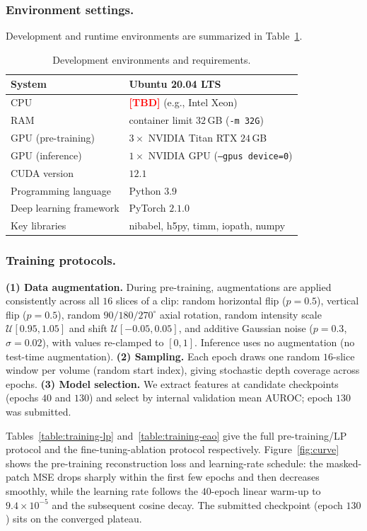 \documentclass[runningheads]{llncs}
\newcommand{\tba}{\textcolor{red}{\textbf{[TBD]}}}
\begin{document}
\subsubsection{Environment settings.}
Development and runtime environments are summarized in Table~\ref{table:env}.

\begin{table}[!htbp]
\caption{Development environments and requirements.}\label{table:env}
\centering
\begin{tabular}{ll}
\hline
System            & Ubuntu 20.04 LTS \\ \hline
CPU               & \tba{} (e.g., Intel Xeon) \\ \hline
RAM               & container limit $32$\,GB (\texttt{-m 32G}) \\ \hline
GPU (pre-training)& $3\times$ NVIDIA Titan RTX $24$\,GB \\ \hline
GPU (inference)   & $1\times$ NVIDIA GPU (\texttt{--gpus device=0}) \\ \hline
CUDA version      & $12.1$ \\ \hline
Programming language & Python $3.9$ \\ \hline
Deep learning framework & PyTorch $2.1.0$ \\ \hline
Key libraries     & nibabel, h5py, timm, iopath, numpy \\ \hline
\end{tabular}
\end{table}

\subsubsection{Training protocols.}
\textbf{(1) Data augmentation.} During pre-training, augmentations are applied
consistently across all $16$ slices of a clip: random horizontal flip ($p{=}0.5$),
vertical flip ($p{=}0.5$), random $90/180/270^{\circ}$ axial rotation, random
intensity scale $\mathcal{U}[0.95,1.05]$ and shift $\mathcal{U}[-0.05,0.05]$, and
additive Gaussian noise ($p{=}0.3$, $\sigma{=}0.02$), with values re-clamped to
$[0,1]$. Inference uses no augmentation (no test-time augmentation).
\textbf{(2) Sampling.} Each epoch draws one random $16$-slice window per volume
(random start index), giving stochastic depth coverage across epochs.
\textbf{(3) Model selection.} We extract features at candidate checkpoints
(epochs $40$ and $130$) and select by internal validation mean AUROC; epoch
$130$ was submitted.

Tables~\ref{table:training-lp} and~\ref{table:training-eao} give the full
pre-training/LP protocol and the fine-tuning-ablation protocol respectively.
Figure~\ref{fig:curve} shows the pre-training reconstruction loss and learning-rate
schedule: the masked-patch MSE drops sharply within the first few epochs and then
decreases smoothly, while the learning rate follows the $40$-epoch linear warm-up
to $9.4\times10^{-5}$ and the subsequent cosine decay. The submitted checkpoint
(epoch $130$) sits on the converged plateau.
\end{document}
